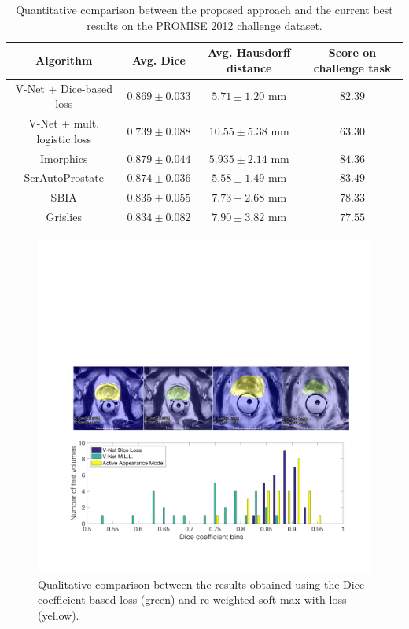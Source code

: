 \begin{table}
\caption{Quantitative comparison between the proposed approach and the current best results on the PROMISE 2012 challenge dataset.} \label{tab:res}
\begin{tabular}{|c|c|c|c|}
\hline 
Algorithm & Avg. Dice & Avg. Hausdorff distance & Score on challenge task\tabularnewline
\hline 
\hline 
V-Net + Dice-based loss & $0.869 \pm 0.033$ & $5.71 \pm 1.20$ mm & $82.39$\tabularnewline
\hline 
V-Net + mult. logistic loss & $0.739 \pm 0.088 $ & $10.55 \pm 5.38$ mm & $63.30$\tabularnewline
\hline 
Imorphics \cite{imorp} & $0.879 \pm 0.044$ & $5.935 \pm 2.14 $ mm & $84.36$\tabularnewline
\hline 
ScrAutoProstate & $0.874 \pm 0.036$ & $5.58 \pm 1.49 $ mm & $83.49$ \tabularnewline
\hline
SBIA & $0.835 \pm 0.055$ & $7.73 \pm 2.68 $ mm & $78.33$ \tabularnewline
\hline
Grislies & $0.834 \pm 0.082$ & $7.90 \pm 3.82 $ mm & $77.55$ \tabularnewline
\hline

\end{tabular}

\end{table}

\begin{figure} 	
\centering 	
\includegraphics[scale=0.208]{dice_vs_softmaxwithloss.pdf} 	
\caption{Qualitative comparison between the results obtained using the Dice coefficient based loss (green) and re-weighted soft-max with loss (yellow).} \label{fig:qualitativecomparison} 
\end{figure}

